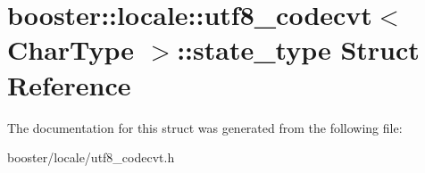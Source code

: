 \section{booster\+:\+:locale\+:\+:utf8\+\_\+codecvt$<$ Char\+Type $>$\+:\+:state\+\_\+type Struct Reference}
\label{structbooster_1_1locale_1_1utf8__codecvt_1_1state__type}


The documentation for this struct was generated from the following file\+:\begin{DoxyCompactItemize}
\item 
booster/locale/utf8\+\_\+codecvt.\+h\end{DoxyCompactItemize}
